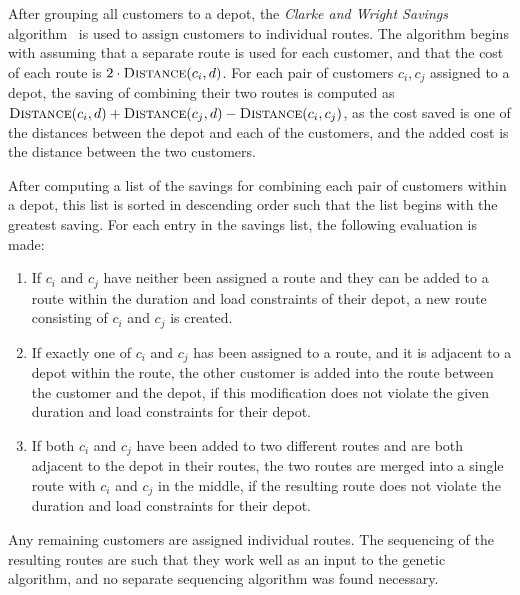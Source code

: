 \documentclass[paper=a4, fontsize=9pt]{scrartcl}
\begin{document}
\begin{multicols}{2}
\vspace{0.2cm}

After grouping all customers to a depot, the \textit{Clarke and Wright Savings} algorithm~\cite{clarke1964scheduling} is used to assign customers to individual routes. The algorithm begins with assuming that a separate route is used for each customer, and that the cost of each route is $2 \cdot \textsc{Distance}(c_i, d)$. For each pair of customers $c_i, c_j$ assigned to a depot, the saving of combining their two routes is computed as $\textsc{Distance}(c_i, d) + \textsc{Distance}(c_j, d) - \textsc{Distance}(c_i, c_j)$, as the cost saved is one of the distances between the depot and each of the customers, and the added cost is the distance between the two customers.

After computing a list of the savings for combining each pair of customers within a depot, this list is sorted in descending order such that the list begins with the greatest saving. For each entry in the savings list, the following evaluation is made:

\begin{enumerate}[label=\alph*)]
    \item If $c_i$ and $c_j$ have neither been assigned a route and they can be added to a route within the duration and load constraints of their depot, a new route consisting of $c_i$ and $c_j$ is created.
    \item If exactly one of $c_i$ and $c_j$ has been assigned to a route, and it is adjacent to a depot within the route, the other customer is added into the route between the customer and the depot, if this modification does not violate the given duration and load constraints for their depot.
    \item If both $c_i$ and $c_j$ have been added to two different routes and are both adjacent to the depot in their routes, the two routes are merged into a single route with $c_i$ and $c_j$ in the middle, if the resulting route does not violate the duration and load constraints for their depot.
\end{enumerate}

Any remaining customers are assigned individual routes. The sequencing of the resulting routes are such that they work well as an input to the genetic algorithm, and no separate sequencing algorithm was found necessary.


\end{multicols}
\end{document}

